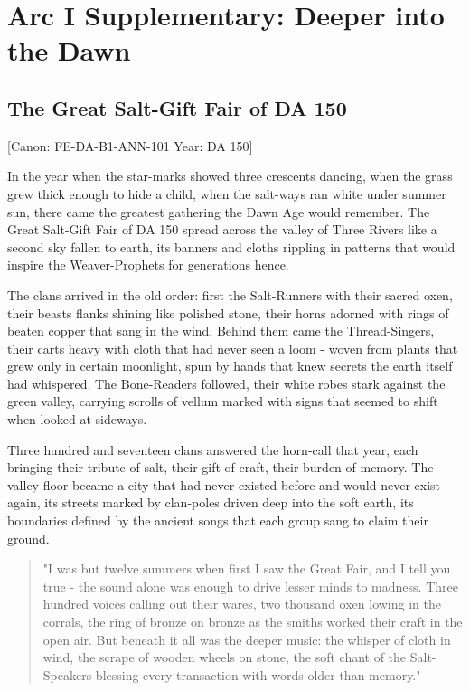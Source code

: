 \section{Arc I Supplementary: Deeper into the
Dawn}\label{arc-i-supplementary-deeper-into-the-dawn}

\subsection{The Great Salt-Gift Fair of DA
150}\label{the-great-salt-gift-fair-of-da-150}

{[}Canon: FE-DA-B1-ANN-101 \textbar{} Year: DA 150{]}

In the year when the star-marks showed three crescents dancing, when the
grass grew thick enough to hide a child, when the salt-ways ran white
under summer sun, there came the greatest gathering the Dawn Age would
remember. The Great Salt-Gift Fair of DA 150 spread across the valley of
Three Rivers like a second sky fallen to earth, its banners and cloths
rippling in patterns that would inspire the Weaver-Prophets for
generations hence.

The clans arrived in the old order: first the Salt-Runners with their
sacred oxen, their beasts\textquotesingle{} flanks shining like polished
stone, their horns adorned with rings of beaten copper that sang in the
wind. Behind them came the Thread-Singers, their carts heavy with cloth
that had never seen a loom - woven from plants that grew only in certain
moonlight, spun by hands that knew secrets the earth itself had
whispered. The Bone-Readers followed, their white robes stark against
the green valley, carrying scrolls of vellum marked with signs that
seemed to shift when looked at sideways.

Three hundred and seventeen clans answered the horn-call that year, each
bringing their tribute of salt, their gift of craft, their burden of
memory. The valley floor became a city that had never existed before and
would never exist again, its streets marked by clan-poles driven deep
into the soft earth, its boundaries defined by the ancient songs that
each group sang to claim their ground.

\begin{quote}
"I was but twelve summers when first I saw the Great Fair, and I tell
you true - the sound alone was enough to drive lesser minds to madness.
Three hundred voices calling out their wares, two thousand oxen lowing
in the corrals, the ring of bronze on bronze as the smiths worked their
craft in the open air. But beneath it all was the deeper music: the
whisper of cloth in wind, the scrape of wooden wheels on stone, the soft
chant of the Salt-Speakers blessing every transaction with words older
than memory."
\end{quote}

